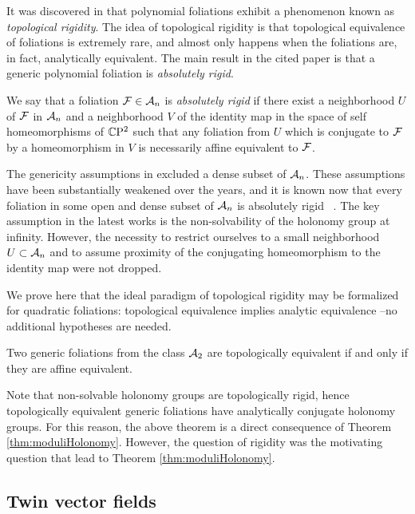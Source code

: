 \documentclass[phd,tocprelim]{cornell}
\begin{document}
It was discovered in \cite{Ilyashenko1978} that polynomial foliations exhibit a phenomenon known as \textit{topological rigidity}. The idea of topological rigidity is that topological equivalence of foliations is extremely rare, and almost only happens when the foliations are, in fact, analytically equivalent. The main result in the cited paper is that a generic polynomial foliation is \textit{absolutely rigid}.

\begin{definition}
We say that a foliation $\mathcal{F}\in\mathcal{A}_n$ is \emph{absolutely rigid} if there exist a neighborhood $U$ of $\mathcal{F}$ in $\mathcal{A}_n$ and a neighborhood $V$ of the identity map in the space of self homeomorphisms of $\mathbb{C}\mathrm{P}^2$ such that any foliation from $U$ which is conjugate to $\mathcal{F}$ by a homeomorphism in $V$ is necessarily affine equivalent to $\mathcal{F}$.
\end{definition}

The genericity assumptions in \cite{Ilyashenko1978} excluded a dense subset of $\mathcal{A}_n$. These assumptions have been substantially weakened over the years, and it is known now that every foliation in some open and dense subset of $\mathcal{A}_n$ is absolutely rigid ~\cite{Shcherbakov1984,Nakai1994,LinsNetoSadScardua1998}. The key assumption in the latest works is the non-solvability of the holonomy group at infinity. However, the necessity to restrict ourselves to a small neighborhood $U\subset\mathcal{A}_n$ and to assume proximity of the conjugating homeomorphism to the identity map were not dropped.

We prove here that the ideal paradigm of topological rigidity may be formalized for quadratic foliations: topological equivalence implies analytic equivalence --no additional hypotheses are needed.

\begin{theorem}\label{thm:utmost}
 Two generic foliations from the class $\mathcal{A}_2$ are topologically equivalent if and only if they are affine equivalent.
\end{theorem}

Note that non-solvable holonomy groups are topologically rigid, hence topologically equivalent generic foliations have analytically conjugate holonomy groups. For this reason, the above theorem is a direct consequence of Theorem \ref{thm:moduliHolonomy}. However, the question of rigidity was the motivating question that lead to Theorem \ref{thm:moduliHolonomy}.


\subsection{Twin vector fields}
\end{document}
